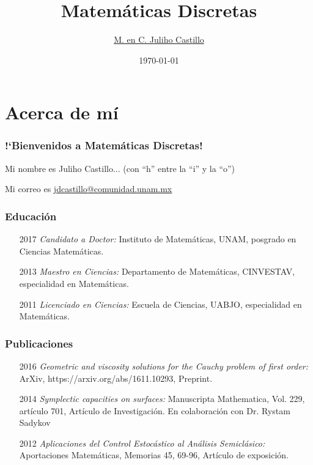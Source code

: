 \documentclass[xcolor={svgnames},
  hyperref={colorlinks}, 
  spanish, 12pt]{beamer}
\title{Matem\'aticas Discretas}
\author[Juliho Castillo]{\href{https://www.youtube.com/channel/UCb1i-EtybaWWX5urFfmMUWQ}{M. en C. Juliho Castillo}}
\institute[ITESM CMM]{Tec de Monterrey, Campus Ciudad de M\'exico}
\date{\today}
\numberwithin{equation}{section} %
\numberwithin{figure}{section} %
\theoremstyle{plain}
\theoremstyle{definition}
\theoremstyle{remark}
\begin{document}

\frame{
\titlepage
}

\frame{\tableofcontents}



\section{Acerca de m\'i}

\begin{frame}
 \frametitle{!`Bienvenidos a Matem\'aticas Discretas!}
 Mi nombre es Juliho Castillo... \pause
 (con ``h'' entre la ``i'' y la ``o'') \pause
 
 Mi correo es \href{mailto:jdcastillo@comunidad.unam.mx}{jdcastillo@comunidad.unam.mx}
\end{frame}

\begin{frame}[<+->]
 \frametitle{Educaci\'on}
 \begin{enumerate}
  \item[2017] \emph{Candidato a Doctor:} Instituto de Matemáticas, UNAM, posgrado en Ciencias Matemáticas. 
\item[2013] \emph{Maestro en Ciencias:} Departamento de Matemáticas, CINVESTAV, especialidad en Matemáticas.
\item[2011] \emph{Licenciado en Ciencias:} Escuela de Ciencias, UABJO, especialidad en Matemáticas.
 \end{enumerate}
\end{frame}

\begin{frame}
 \frametitle{Publicaciones}
 \begin{enumerate}
  \item[2016] \emph{Geometric and viscosity solutions for the Cauchy problem of first order:} ArXiv,
https://arxiv.org/abs/1611.10293, Preprint.
  \item[2014] \emph{Symplectic capacities on surfaces:} Manuscripta Mathematica, Vol. 229, artículo 701, Artículo de Investigación. En colaboración con Dr. Rystam Sadykov
  \item[2012] \emph{Aplicaciones del Control Estocástico al Análisis Semiclásico:} Aportaciones Matemáticas, Memorias 45, 69-96, Artículo de exposición.
 \end{enumerate}
\end{frame}
\end{document}
